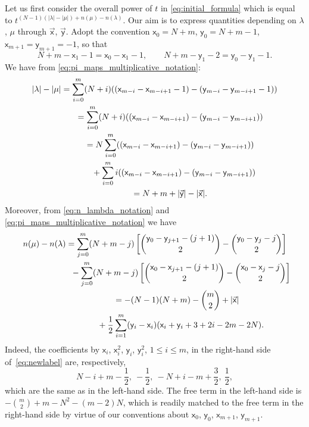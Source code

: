 Let us first consider the overall power of $t$
in \eqref{eq:initial_formula}
which is equal to
$t^{(N-1)(|\lambda|-|\mu|)+n(\mu)-n(\lambda)}$.
Our aim is to express quantities
depending on $\lambda$, $\mu$ through
$\vec{\mathsf{x}}$, $\vec{\mathsf{y}}$.
Adopt the convention
$\mathsf{x}_0=N+m$,
$\mathsf{y}_0=N+m-1$,
$\mathsf{x}_{m+1}=\mathsf{y}_{m+1}=-1$,
so that
\begin{equation*}
	N+m-\mathsf{x}_1-1=\mathsf{x}_0-\mathsf{x}_1-1,\qquad
	N+m-\mathsf{y}_1-2=\mathsf{y}_0-\mathsf{y}_1-1.
\end{equation*}
We have from \eqref{eq:pi_maps_multiplicative_notation}:
\begin{gather*}
	|\lambda|-|\mu|	=
	\sum_{i=0}^{m}
	(N+i)
	(
	( \mathsf{x}_{m-i}-\mathsf{x}_{m-i+1}-1 )-
	( \mathsf{y}_{m-i}-\mathsf{y}_{m-i+1}-1)
)
	\\
\hphantom{|\lambda|-|\mu|}{}
=
	\sum_{i=0}^{m}
	(N+i)
	(
	( \mathsf{x}_{m-i}-\mathsf{x}_{m-i+1} )-
	( \mathsf{y}_{m-i}-\mathsf{y}_{m-i+1} )
)
	\\
\hphantom{|\lambda|-|\mu|}{}
=
	N\sum_{i=0}^{m}
	(
	( \mathsf{x}_{m-i}-\mathsf{x}_{m-i+1} )-
	( \mathsf{y}_{m-i}-\mathsf{y}_{m-i+1} )
	)\\
\hphantom{|\lambda|-|\mu|=}{}
	+
	\sum_{i=0}^{m}i
	(
	( \mathsf{x}_{m-i}-\mathsf{x}_{m-i+1} )-
	( \mathsf{y}_{m-i}-\mathsf{y}_{m-i+1})
	)
	\\
\hphantom{|\lambda|-|\mu|}{}
=
	N+m+
	|\vec {\mathsf{y}}|-|\vec{\mathsf{x}}|.
\end{gather*}
Moreover, from
\eqref{eq:n_lambda_notation} and \eqref{eq:pi_maps_multiplicative_notation}
we have
\begin{gather}
	\nonumber
	n(\mu)-n(\lambda)
	=
	\sum_{j=0}^{m}
	(N+m-j)
	\left[
		\binom{\mathsf{y}_0-\mathsf{y}_{j+1}-(j+1)}2-
		\binom{\mathsf{y}_0-\mathsf{y}_{j}-j}2
	\right]
	\\
\hphantom{n(\mu)-n(\lambda)=}{}
-
	\sum_{j=0}^{m}
	(N+m-j)
	\left[
		\binom{\mathsf{x}_0-\mathsf{x}_{j+1}-(j+1)}2-
		\binom{\mathsf{x}_0-\mathsf{x}_{j}-j}2
	\right]
\nonumber\\
\hphantom{n(\mu)-n(\lambda)}{}
=
	-(N-1)(N+m)
	-\binom{m}{2}
	+|\vec{\mathsf{x}}|\nonumber\\
\hphantom{n(\mu)-n(\lambda)=}{}
+
	\frac12
	\sum_{i=1}^{m}
	(\mathsf{y}_i-\mathsf{x}_i)(\mathsf{x}_i+\mathsf{y}_i+3+2i-2m-2N).
\label{eq:newlabel}
\end{gather}
Indeed, the coefficients
by $\mathsf{x}_i$, $\mathsf{x}_i^2$, $\mathsf{y}_i$, $\mathsf{y}_i^2$, $1\le i\le m$, in the right-hand side of~\eqref{eq:newlabel}
are, respectively,
\begin{equation*}
	N - i + m - \frac{1}{2}
	,\
	-\frac{1}{2}
	,\
	-N + i - m + \frac32
	,\
	\frac{1}{2},
\end{equation*}
which are the same as in the left-hand side.
The free term in the left-hand side is
$-\binom m2+m-N^2-(m-2)N$,
which is readily matched to the free term in the
right-hand side by virtue of
our conventions about
$\mathsf{x}_0$, $\mathsf{y}_0$, $\mathsf{x}_{m+1}$, $\mathsf{y}_{m+1}$.

